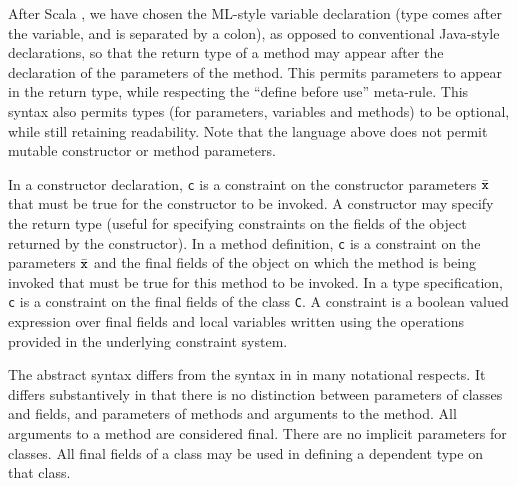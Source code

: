 \documentclass{article}
\begin{document}
After Scala \cite{scala}, we have chosen the ML-style variable
declaration (type comes after the variable, and is separated by a
colon), as opposed to conventional Java-style declarations, so that
the return type of a method may appear after the declaration of the
parameters of the method. This permits parameters to appear in the
return type, while respecting the ``define before use''
meta-rule. This syntax also permits types (for parameters, variables
and methods) to be optional, while still retaining readability.  Note
that the language above does not permit mutable constructor or method
parameters.

In a constructor declaration, {\tt c} is a constraint on the
constructor parameters $\bar{\tt x}$ that must be true for the
constructor to be invoked.  A constructor may specify the return type
(useful for specifying constraints on the fields of the object
returned by the constructor).  In a method definition, {\tt c} is a
constraint on the parameters $\bar{\tt x}$ and the final fields of the
object on which the method is being invoked that must be true for this
method to be invoked. In a type specification, {\tt c} is a constraint
on the final fields of the class {\tt C}. A constraint is a boolean
valued expression over final fields and local variables written using
the operations provided in the underlying constraint system.

The abstract syntax differs from the syntax in \cite{DependentTypes}
in many notational respects. It differs substantively in that there is
no distinction between parameters of classes and fields, and
parameters of methods and arguments to the method. All arguments to a
method are considered final. There are no implicit parameters for
classes.  All final fields of a class may be used in defining a
dependent type on that class.
\end{document}
